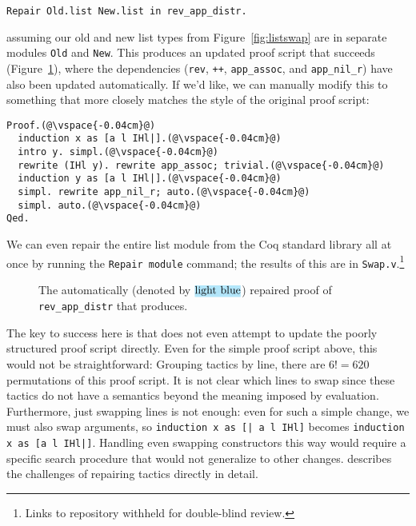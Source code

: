 \begin{lstlisting}
Repair Old.list New.list in rev_app_distr.
\end{lstlisting}
assuming our old and new list types from Figure~\ref{fig:listswap} are in separate modules \lstinline{Old} and \lstinline{New}.
This produces an updated proof script that succeeds (Figure~\ref{fig:auto}),
where the dependencies (\lstinline{rev}, \lstinline{++}, \lstinline{app_assoc}, and \lstinline{app_nil_r}) have
also been updated automatically.
If we'd like, we can manually modify this to something that more closely matches the style of the original proof script:

\begin{lstlisting}
Proof.(@\vspace{-0.04cm}@)
  induction x as [a l IHl|].(@\vspace{-0.04cm}@)
  intro y. simpl.(@\vspace{-0.04cm}@)
  rewrite (IHl y). rewrite app_assoc; trivial.(@\vspace{-0.04cm}@)
  induction y as [a l IHl|].(@\vspace{-0.04cm}@)
  simpl. rewrite app_nil_r; auto.(@\vspace{-0.04cm}@)
  simpl. auto.(@\vspace{-0.04cm}@)
Qed.
\end{lstlisting}
We can even repair the entire list module from the Coq standard library all at once by running the \lstinline{Repair module}
command; the results of this are in \lstinline{Swap.v}.\footnote{Links to repository withheld for double-blind review.} %

\begin{figure}
\codeauto{}
\vspace{-0.3cm}
\caption{The automatically (denoted by $\codeauto{light blue}$) repaired proof of \lstinline{rev_app_distr} that \toolname produces.}
\label{fig:auto}
\end{figure} %

The key to success here is that \toolname does not even attempt to update the poorly structured proof script directly.
Even for the simple proof script above, this would not be straightforward: Grouping tactics by line, there are $6! = 620$
permutations of this proof script.
It is not clear which lines to swap since these tactics do not have a semantics beyond the meaning imposed by evaluation.
Furthermore, just swapping lines is not enough: even for such a simple change, we must also swap
arguments, so \lstinline{induction x as [| a l IHl]} becomes \lstinline{induction x as [a l IHl|]}.
Handling even swapping constructors this way would require a specific search procedure that would not generalize to other changes.
\citet{robert2018} describes the challenges of repairing tactics directly in detail.


